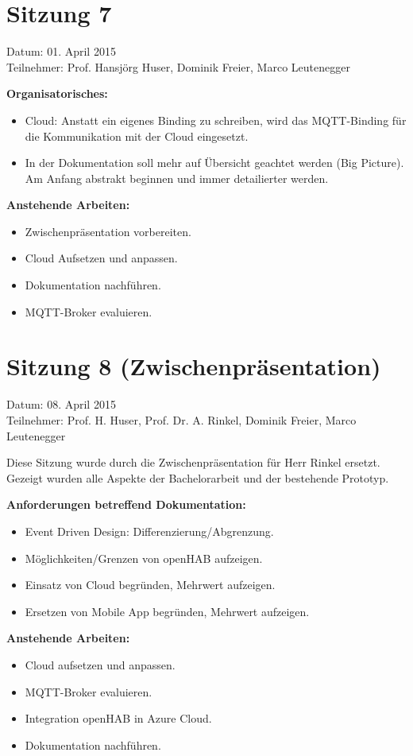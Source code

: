 \section*{Sitzung 7}
	Datum: 01. April 2015 \\
	Teilnehmer: Prof. Hansjörg Huser, Dominik Freier, Marco Leutenegger

	\textbf{Organisatorisches:}
	\begin{itemize}
		\item Cloud: Anstatt ein eigenes Binding zu schreiben, wird das MQTT-Binding für die Kommunikation mit der Cloud eingesetzt.
		\item In der Dokumentation soll mehr auf Übersicht geachtet werden (Big Picture). Am Anfang abstrakt beginnen und immer detailierter werden.
	\end{itemize}

	\textbf{Anstehende Arbeiten:}
	\begin{itemize}
		\item Zwischenpräsentation vorbereiten.
		\item Cloud Aufsetzen und anpassen.
		\item Dokumentation nachführen.
		\item MQTT-Broker evaluieren.
	\end{itemize}
	
\section*{Sitzung 8 (Zwischenpräsentation)}
	Datum: 08. April 2015 \\
	Teilnehmer: Prof. H. Huser, Prof. Dr. A. Rinkel, Dominik Freier, Marco Leutenegger 
	
	Diese Sitzung wurde durch die Zwischenpräsentation für Herr Rinkel ersetzt. Gezeigt wurden alle Aspekte der Bachelorarbeit und der bestehende Prototyp.

	\textbf{Anforderungen betreffend Dokumentation:}
	\begin{itemize}
		\item Event Driven Design: Differenzierung/Abgrenzung.
		\item Möglichkeiten/Grenzen von openHAB aufzeigen.
		\item Einsatz von Cloud begründen, Mehrwert aufzeigen.
		\item Ersetzen von Mobile App begründen, Mehrwert aufzeigen.
	\end{itemize}

	\textbf{Anstehende Arbeiten:}
	\begin{itemize}
		\item Cloud aufsetzen und anpassen.
		\item MQTT-Broker evaluieren.
		\item Integration openHAB in Azure Cloud.
		\item Dokumentation nachführen.
	\end{itemize}

